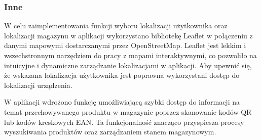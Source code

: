 \documentclass[../../main.tex]{subfiles}
\begin{document}
\subsubsection{Inne}
W celu zaimplementowania funkcji wyboru lokalizacji użytkownika oraz lokalizacji magazynu w aplikacji wykorzystano bibliotekę Leaflet w połączeniu z danymi mapowymi dostarczanymi przez OpenStreetMap. Leaflet jest lekkim i wszechstronnym narzędziem do pracy z mapami interaktywnymi, co pozwoliło na intuicyjne i dynamiczne zarządzanie lokalizacjami w aplikacji. Aby upewnić się, że wskazana lokalizacja użytkownika jest poprawna wykorzystani dostęp do lokalizacji urządzenia. 

W aplikacji wdrożono funkcję umożliwiającą szybki dostęp do informacji na temat przechowywanego produktu w magazynie poprzez skanowanie kodów QR lub kodów kreskowych EAN. Ta funkcjonalność znacząco przyspiesza procesy wyszukiwania produktów oraz zarządzaniem stanem magazynowym.
\end{document}
